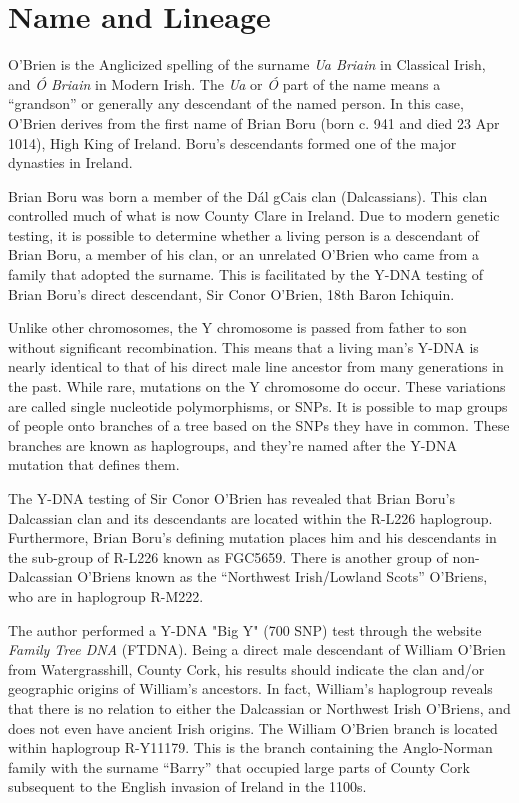 \chapter{Name and Lineage}

O'Brien is the Anglicized spelling of the surname \textit{Ua Briain} in Classical Irish, and \textit{\'{O} Briain} in Modern Irish. The \textit{Ua} or \textit{\'{O}} part of the name means a ``grandson'' or generally any descendant of the named person. In this case, O'Brien derives from the first name of Brian Boru (born c. 941 and died 23 Apr 1014), High King of Ireland. Boru's descendants formed one of the major dynasties in Ireland.\cite{BoruHistorical}

Brian Boru was born a member of the D\'{a}l gCais clan (Dalcassians). This clan controlled much of what is now County Clare in Ireland.\cite{BoruEarlyHistory} Due to modern genetic testing, it is possible to determine whether a living person is a descendant of Brian Boru, a member of his clan, or an unrelated O'Brien who came from a family that adopted the surname. This is facilitated by the Y-DNA testing of Brian Boru's direct descendant, Sir Conor O'Brien, 18th Baron Ichiquin.\cite{GGI}

Unlike other chromosomes, the Y chromosome is passed from father to son without significant recombination. This means that a living man's Y-DNA is nearly identical to that of his direct male line ancestor from many generations in the past. While rare, mutations on the Y chromosome do occur. These variations are called single nucleotide polymorphisms, or SNPs. It is possible to map groups of people onto branches of a tree based on the SNPs they have in common. These branches are known as haplogroups, and they're named after the Y-DNA mutation that defines them.\cite{Bettinger}

The Y-DNA testing of Sir Conor O'Brien has revealed that Brian Boru's Dalcassian clan and its descendants are located within the R-L226 haplogroup. Furthermore, Brian Boru's defining mutation places him and his descendants in the sub-group of R-L226 known as FGC5659. There is another group of non-Dalcassian O'Briens known as the ``Northwest Irish/Lowland Scots'' O'Briens, who are in haplogroup R-M222.\cite{GGI}

The author performed a Y-DNA "Big Y" (700 SNP) test through the website \textit{Family Tree DNA} (FTDNA). Being a direct male descendant of William O'Brien from Watergrasshill, County Cork, his results should indicate the clan and/or geographic origins of William's ancestors. In fact, William's haplogroup reveals that there is no relation to either the Dalcassian or Northwest Irish O'Briens, and does not even have ancient Irish origins. The William O'Brien branch is located within haplogroup R-Y11179. This is the branch containing the Anglo-Norman family with the surname ``Barry'' that occupied large parts of County Cork subsequent to the English invasion of Ireland in the 1100s.\cite{JamesBarry1,BigY}

